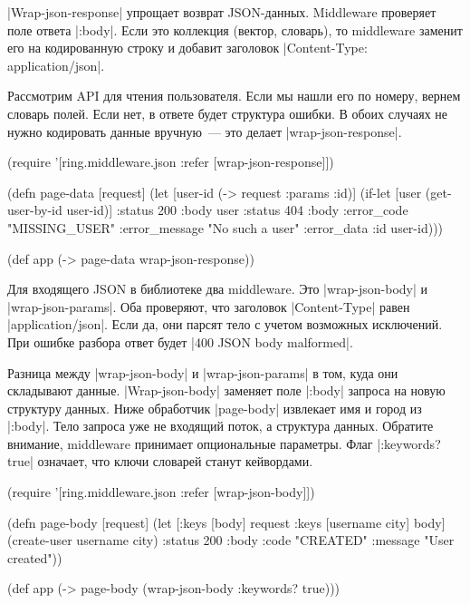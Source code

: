 \spverb|Wrap-json-response| упрощает возврат JSON-данных. Middleware проверяет
поле ответа \spverb|:body|. Если это коллекция (вектор, словарь), то middleware
заменит его на кодированную строку и добавит заголовок
\spverb|Content-Type: application/json|.

Рассмотрим API для чтения пользователя. Если мы нашли его по номеру, вернем
словарь полей. Если нет, в ответе будет структура ошибки. В обоих случаях не
нужно кодировать данные вручную~--- это делает \spverb|wrap-json-response|.

\begin{english}
  \begin{clojure}
(require '[ring.middleware.json
           :refer [wrap-json-response]])

(defn page-data [request]
  (let [user-id (-> request :params :id)]
    (if-let [user (get-user-by-id user-id)]
      {:status 200 :body user}
      {:status 404
       :body {:error_code "MISSING_USER"
              :error_message "No such a user"
              :error_data {:id user-id}}})))

(def app (-> page-data wrap-json-response))
  \end{clojure}
\end{english}

Для входящего JSON в библиотеке два middleware. Это \spverb|wrap-json-body| и
\spverb|wrap-json-params|. Оба проверяют, что заголовок \spverb|Content-Type|
равен \spverb|application/json|. Если да, они парсят тело с учетом возможных
исключений. При ошибке разбора ответ будет \spverb|400 JSON body malformed|.

Разница между \spverb|wrap-json-body| и \spverb|wrap-json-params| в том, куда
они складывают данные. \spverb|Wrap-json-body| заменяет поле \spverb|:body|
запроса на новую структуру данных. Ниже обработчик \spverb|page-body| извлекает
имя и город из \spverb|:body|. Тело запроса уже не входящий поток, а структура
данных. Обратите внимание, middleware принимает опциональные параметры. Флаг
\spverb|:keywords? true| означает, что ключи словарей станут кейвордами.

\begin{english}
  \begin{clojure}
(require '[ring.middleware.json :refer [wrap-json-body]])

(defn page-body [request]
  (let [{:keys [body]} request
        {:keys [username city]} body]
    (create-user username city)
    {:status 200
     :body {:code "CREATED"
            :message "User created"}}))

(def app (-> page-body
             (wrap-json-body {:keywords? true})))
  \end{clojure}
\end{english}

